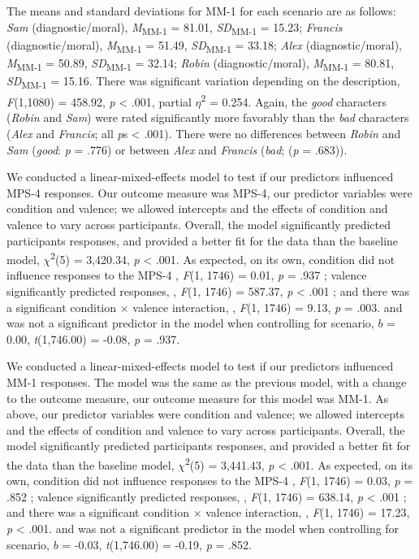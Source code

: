 \documentclass[
  american,
  man,floatsintext]{apa7}
\begin{document}
The means and standard deviations for MM-1 for each scenario are as follows:
\emph{Sam} (diagnostic/moral),
\emph{M}\textsubscript{MM-1} = 81.01, \emph{SD}\textsubscript{MM-1} = 15.23;
\emph{Francis} (diagnostic/moral),
\emph{M}\textsubscript{MM-1} = 51.49, \emph{SD}\textsubscript{MM-1} = 33.18;
\emph{Alex} (diagnostic/moral),
\emph{M}\textsubscript{MM-1} = 50.89, \emph{SD}\textsubscript{MM-1} = 32.14;
\emph{Robin} (diagnostic/moral),
\emph{M}\textsubscript{MM-1} = 80.81, \emph{SD}\textsubscript{MM-1} = 15.16. There was significant variation depending on the description, \emph{F}(1,1080) = 458.92, \emph{p} \textless{} .001, partial \(\eta\)\textsuperscript{2} = 0.254. Again, the \emph{good} characters (\emph{Robin} and \emph{Sam}) were rated significantly more favorably than the \emph{bad} characters (\emph{Alex} and \emph{Francis}; all \emph{p}s \textless{} .001). There were no differences between \emph{Robin} and \emph{Sam} (\emph{good}: \emph{p} = .776) or between \emph{Alex} and \emph{Francis} (\emph{bad}; (\emph{p} = .683)).

We conducted a linear-mixed-effects model to test if our predictors influenced MPS-4 responses. Our outcome measure was MPS-4, our predictor variables were condition and valence; we allowed intercepts and the effects of condition and valence to vary across participants.
Overall, the model significantly predicted participants responses, and provided a better fit for the data than the baseline model,
\(\chi\)\textsuperscript{2}(5) = 3,420.34, \emph{p} \textless{} .001.
As expected, on its own, condition did not influence responses to the MPS-4
, \emph{F}(1, 1746) = 0.01, \emph{p} = .937
; valence significantly predicted responses,
, \emph{F}(1, 1746) = 587.37, \emph{p} \textless{} .001
; and there was a significant condition \(\times\) valence interaction,
, \emph{F}(1, 1746) = 9.13, \emph{p} = .003.
and was not a significant predictor in the model when controlling for scenario, \(b\) = 0.00, \emph{t}(1,746.00) = -0.08, \emph{p} = .937.

We conducted a linear-mixed-effects model to test if our predictors influenced MM-1 responses. The model was the same as the previous model, with a change to the outcome measure, our outcome measure for this model was MM-1. As above, our predictor variables were condition and valence; we allowed intercepts and the effects of condition and valence to vary across participants.
Overall, the model significantly predicted participants responses, and provided a better fit for the data than the baseline model,
\(\chi\)\textsuperscript{2}(5) = 3,441.43, \emph{p} \textless{} .001.
As expected, on its own, condition did not influence responses to the MPS-4
, \emph{F}(1, 1746) = 0.03, \emph{p} = .852
; valence significantly predicted responses,
, \emph{F}(1, 1746) = 638.14, \emph{p} \textless{} .001
; and there was a significant condition \(\times\) valence interaction,
, \emph{F}(1, 1746) = 17.23, \emph{p} \textless{} .001.
and was not a significant predictor in the model when controlling for scenario, \(b\) = -0.03, \emph{t}(1,746.00) = -0.19, \emph{p} = .852.
\end{document}
